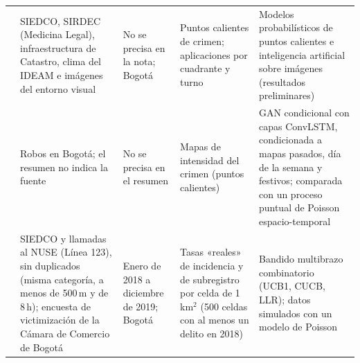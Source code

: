{\begin{longtable}{@{}>{\raggedright\arraybackslash}p{2.2cm}>{\raggedright\arraybackslash}p{4.0cm}>{\raggedright\arraybackslash}p{2.4cm}>{\raggedright\arraybackslash}p{2.9cm}>{\raggedright\arraybackslash}p{3.0cm}@{}}
\addlinespace
\citet{riascos2020} & SIEDCO, SIRDEC (Medicina Legal), infraestructura de Catastro, clima del IDEAM e imágenes del entorno visual & No se precisa en la nota; Bogotá & Puntos calientes de crimen; aplicaciones por cuadrante y turno & Modelos probabilísticos de puntos calientes e inteligencia artificial sobre imágenes (resultados preliminares) \\
\addlinespace
\citet{urcuqui2020} & Robos en Bogotá; el resumen no indica la fuente & No se precisa en el resumen & Mapas de intensidad del crimen (puntos calientes) & GAN condicional con capas ConvLSTM, condicionada a mapas pasados, día de la semana y festivos; comparada con un proceso puntual de Poisson espacio-temporal \\
\addlinespace
\citet{riascos2023} & SIEDCO y llamadas al NUSE (Línea 123), sin duplicados (misma categoría, a menos de 500\,m y de 8\,h); encuesta de victimización de la Cámara de Comercio de Bogotá & Enero de 2018 a diciembre de 2019; Bogotá & Tasas «reales» de incidencia y de subregistro por celda de 1\,km$^2$ (500 celdas con al menos un delito en 2018) & Bandido multibrazo combinatorio (UCB1, CUCB, LLR); datos simulados con un modelo de Poisson \\
\end{longtable}

}
